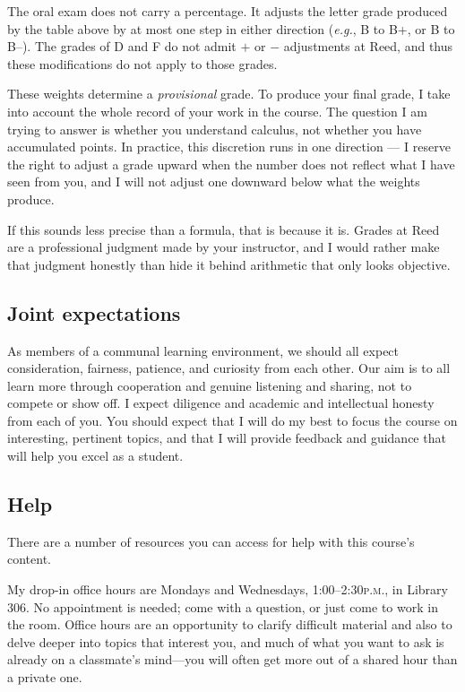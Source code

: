 \documentclass[11pt,twoside]{amsart}
\begin{document}
\medskip

The oral exam does not carry a percentage. It adjusts the letter grade produced by the table above by at most one step in either direction (\emph{e.g.}, B to B+, or B to B--). The grades of D and F do not admit $+$ or $-$ adjustments at Reed, and thus these modifications do not apply to those grades.

These weights determine a \emph{provisional} grade. To produce your final grade, I take into account the whole record of your work in the course. The question I am trying to answer is whether you understand calculus, not whether you have accumulated points. In practice, this discretion runs in one direction --- I reserve the right to adjust a grade upward when the number does not reflect what I have seen from you, and I will not adjust one downward below what the weights produce.

If this sounds less precise than a formula, that is because it is. Grades at Reed are a professional judgment made by your instructor, and I would rather make that judgment honestly than hide it behind arithmetic that only looks objective.

\subsection*{Joint expectations}
As members of a communal learning environment, we should all expect consideration, fairness, patience, and curiosity from each other.  Our aim is to all learn more through cooperation and genuine listening and sharing, not to compete or show off.  I expect diligence and academic and intellectual honesty from each of you.  You should expect that I will do my best to focus the course on interesting, pertinent topics, and that I will provide feedback and guidance that will help you excel as a student.

\subsection*{Help}
There are a number of resources you can access for help with this course's content.

My drop-in office hours are Mondays and Wednesdays, 1:00--2:30\textsc{p.m.}, in Library 306.  No appointment is needed; come with a question, or just come to work in the room.  Office hours are an opportunity to clarify difficult material and also to delve deeper into topics that interest you, and much of what you want to ask is already on a classmate's mind---you will often get more out of a shared hour than a private one.
\end{document}
